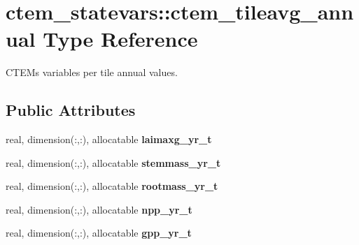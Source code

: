\hypertarget{structctem__statevars_1_1ctem__tileavg__annual}{}\section{ctem\+\_\+statevars\+:\+:ctem\+\_\+tileavg\+\_\+annual Type Reference}
\label{structctem__statevars_1_1ctem__tileavg__annual}


C\+T\+E\+M\textquotesingle{}s variables per tile annual values.  


\subsection*{Public Attributes}
\begin{DoxyCompactItemize}
\item 
\hypertarget{structctem__statevars_1_1ctem__tileavg__annual_a3fd6b679466e3b9886b00183246fc13d}{}real, dimension(\+:,\+:), allocatable {\bfseries laimaxg\+\_\+yr\+\_\+t}\label{structctem__statevars_1_1ctem__tileavg__annual_a3fd6b679466e3b9886b00183246fc13d}

\item 
\hypertarget{structctem__statevars_1_1ctem__tileavg__annual_aba91807b85fd59ad73520bfe080ee3ad}{}real, dimension(\+:,\+:), allocatable {\bfseries stemmass\+\_\+yr\+\_\+t}\label{structctem__statevars_1_1ctem__tileavg__annual_aba91807b85fd59ad73520bfe080ee3ad}

\item 
\hypertarget{structctem__statevars_1_1ctem__tileavg__annual_a7ca3d3eeaad550bce0f954077fd16b5b}{}real, dimension(\+:,\+:), allocatable {\bfseries rootmass\+\_\+yr\+\_\+t}\label{structctem__statevars_1_1ctem__tileavg__annual_a7ca3d3eeaad550bce0f954077fd16b5b}

\item 
\hypertarget{structctem__statevars_1_1ctem__tileavg__annual_a67363df8c1fe1d8dd198a71d8b7e6051}{}real, dimension(\+:,\+:), allocatable {\bfseries npp\+\_\+yr\+\_\+t}\label{structctem__statevars_1_1ctem__tileavg__annual_a67363df8c1fe1d8dd198a71d8b7e6051}

\item 
\hypertarget{structctem__statevars_1_1ctem__tileavg__annual_ad81c4caa181e28b5ceb94aec7d635c72}{}real, dimension(\+:,\+:), allocatable {\bfseries gpp\+\_\+yr\+\_\+t}\label{structctem__statevars_1_1ctem__tileavg__annual_ad81c4caa181e28b5ceb94aec7d635c72}


\end{DoxyCompactItemize}
